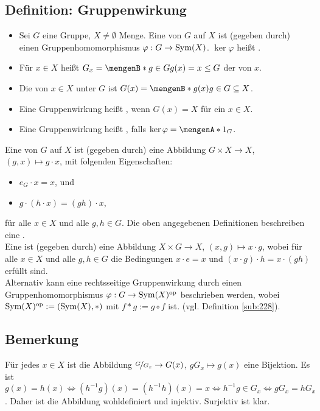 \subsection{Definition: Gruppenwirkung} %
\label{sub:11}
\begin{itemize}
	\item Sei $G$ eine Gruppe, $X \not= \emptyset$ Menge. Eine  von $G$ auf $X$ ist (gegeben durch) einen Gruppenhomomorphismus 
	$\varphi : G \to \operatorname{Sym}(X)$. $\ker \varphi$ heißt .
	\item Für $x \in X$ heißt $G_x = \set[g \in G]{g(x) = x} \le G $ der  von $x$.
	\item Die  von $x \in X$ unter $G$ ist $G(x) = \set[g(x)]{g \in G} \subseteq X$. 
	\item Eine Gruppenwirkung heißt , wenn $G(x)=X$ für ein $x \in X$.
	\item Eine Gruppenwirkung heißt , falls $\ker \varphi = \set{1_G}$. 
\end{itemize}
Eine  von $G$ auf $X$ ist (gegeben durch) eine Abbildung $G\times X \to X$, $(g,x)\mapsto g\cdot x$, mit folgenden Eigenschaften:
\begin{itemize}
	\item $e_G \cdot x= x$, und
	\item $g\cdot(h\cdot x)=(gh)\cdot x$,
\end{itemize}
für alle $x \in X$ und alle $g,h\in G$.
Die oben angegebenen Definitionen beschreiben eine .\\
Eine  ist (gegeben durch) eine Abbildung $X\times G \to X$, $(x,g)\mapsto x\cdot g$, 
wobei für alle $x\in X$ und alle $g,h\in G$ die Bedingungen $x\cdot e=x$ und $(x\cdot g) \cdot h =x \cdot (gh)$ erfüllt sind.\\
Alternativ kann eine rechtsseitige Gruppenwirkung durch einen Gruppenhomomorphismus $\varphi : G \to \operatorname{Sym}(X)^\mathrm{op}$ beschrieben werden, 
wobei $\operatorname{Sym}(X)^\mathrm{op}:=(\operatorname{Sym}(X),*)$ mit $f*g:=g\circ f$ ist. (vgl. Definition \ref{sub:228}).

\subsection[Bemerkung über eine Abbildung $\nicefrac{G}{G_x} \to G(x)$]{Bemerkung} %
\label{sub:12}
Für jedes $x \in X$ ist die Abbildung $\nicefrac{G}{G_x} \to G(x)$, $g G_x \mapsto g(x)$ eine Bijektion.
Es ist $g(x) = h(x) \iff (h ^{-1} g)(x)=(h^{-1}h)(x)=x \iff h ^{-1} g \in G_x \iff g G_x = h G_x$. Daher ist die Abbildung wohldefiniert und injektiv. Surjektiv ist klar. \bewende

